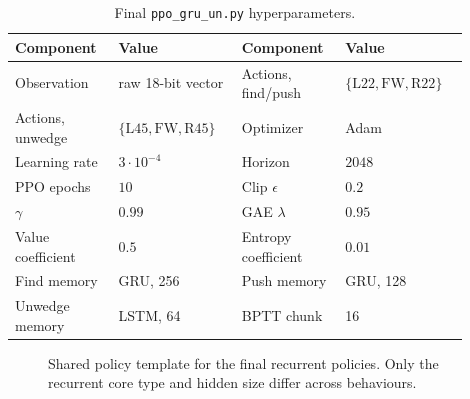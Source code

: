 \documentclass[11pt, oneside]{article}
\begin{document}
\begin{table}[H]
\centering
\caption{Final \texttt{ppo\_gru\_un.py} hyperparameters.}
\begin{tabular}{p{0.20\linewidth}p{0.25\linewidth}p{0.20\linewidth}p{0.25\linewidth}}
\toprule
Component & Value & Component & Value \\
\midrule
Observation & raw 18-bit vector & Actions, find/push & \(\{\text{L22},\text{FW},\text{R22}\}\) \\
Actions, unwedge & \(\{\text{L45},\text{FW},\text{R45}\}\) & Optimizer & Adam \\
Learning rate & \(3\cdot10^{-4}\) & Horizon & \(2048\) \\
PPO epochs & \(10\) & Clip \(\epsilon\) & \(0.2\) \\
\(\gamma\) & \(0.99\) & GAE \(\lambda\) & \(0.95\) \\
Value coefficient & \(0.5\) & Entropy coefficient & \(0.01\) \\
Find memory & GRU, 256 & Push memory & GRU, 128 \\
Unwedge memory & LSTM, 64 & BPTT chunk & 16 \\
\bottomrule
\end{tabular}
\end{table}

\begin{figure}[H]
\centering
{}
\caption{Shared policy template for the final recurrent policies. Only the recurrent core type and hidden size differ across behaviours.}
\end{figure}
\end{document}
